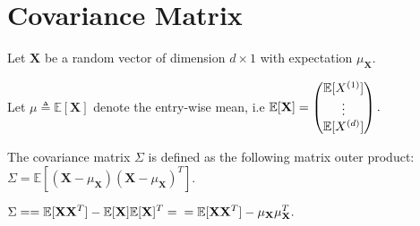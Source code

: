 \section{Covariance Matrix}
Let $\mathbf X$  be a random vector of dimension $d \times 1$ with expectation $\mu _{\mathbf X}$. 

Let $\mu \triangleq \mathbb E[\mathbf X]$  denote the entry-wise mean, i.e $\displaystyle  \displaystyle \mathbb E[\mathbf X] = \displaystyle \begin{pmatrix} \mathbb E[X^{(1)}]\\ \vdots \\ \mathbb E[X^{(d)}]\end{pmatrix}.$


The covariance matrix $\Sigma$ is defined as the following matrix outer product: $\displaystyle  \Sigma = \mathbb E[(\mathbf X- \mu _{\mathbf X})(\mathbf X- \mu _{\mathbf X})^ T].$

$\Sigma = \displaystyle = \mathbb E[\mathbf X\mathbf X^ T] - \mathbb E[\mathbf X]\mathbb E[\mathbf X]^ T =\\
\displaystyle = \mathbb E[\mathbf X\mathbf X^ T] - \mu _{\mathbf X}\mu _{\mathbf X}^ T.$